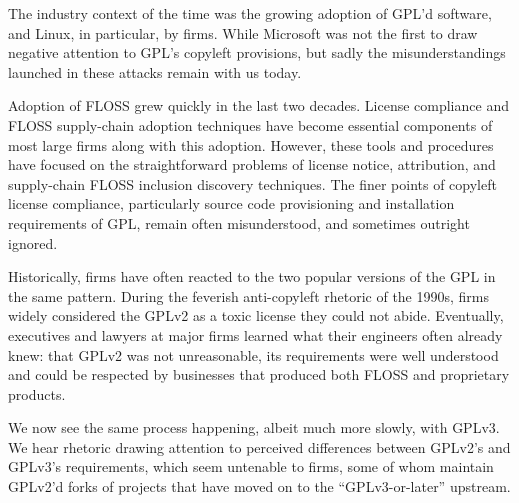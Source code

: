 The industry context of the time was the growing adoption of GPL'd software,
and Linux, in particular, by firms.  While Microsoft was not the first to
draw negative attention to GPL's copyleft provisions, but sadly the
misunderstandings launched in these attacks remain with us today.

Adoption of FLOSS grew quickly in the last two decades.  License compliance
and FLOSS supply-chain adoption techniques have become essential components
of most large firms along with this adoption.  However, these tools and
procedures have focused on the straightforward problems of license notice,
attribution, and supply-chain FLOSS inclusion discovery techniques.  The
finer points of copyleft license compliance, particularly source code
provisioning and installation requirements of GPL, remain often
misunderstood, and sometimes outright ignored.

Historically, firms have often reacted to the two popular versions of the GPL
in the same pattern.  During the feverish anti-copyleft rhetoric of the
1990s, firms widely considered the GPLv2 as a toxic license they could not
abide.  Eventually, executives and lawyers at major firms learned what their
engineers often already knew: that GPLv2 was not unreasonable, its
requirements were well understood and could be respected by businesses that
produced both FLOSS and proprietary products.

We now see the same process happening, albeit much more slowly, with GPLv3.
We hear rhetoric drawing attention to perceived differences between GPLv2's
and GPLv3's requirements, which seem untenable to firms, some of whom
maintain GPLv2'd forks of projects that have moved on to the
``GPLv3-or-later'' upstream.


